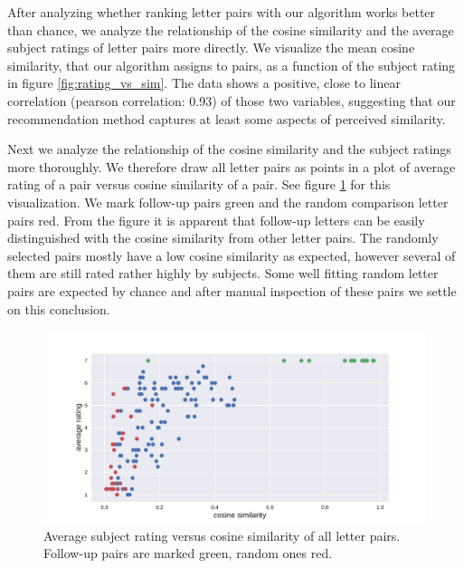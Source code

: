 After analyzing whether ranking letter pairs with our algorithm works better than chance, we analyze the relationship of the cosine similarity and the average subject ratings of letter pairs more directly. We visualize the mean cosine similarity, that our algorithm assigns to pairs, as a function of the subject rating in figure \ref{fig:rating_vs_sim}. The data shows a positive, close to linear correlation (pearson correlation: 0.93) of those two variables, suggesting that our recommendation method captures at least some aspects of perceived similarity.

Next we analyze the relationship of the cosine similarity and the subject ratings more thoroughly. We therefore draw all letter pairs as points in a plot of average rating of a pair versus cosine similarity of a pair. See figure \ref{fig:all_points} for this visualization. We mark follow-up pairs green and the random comparison letter pairs red. From the figure it is apparent that follow-up letters can be easily distinguished with the cosine similarity from other letter pairs. The randomly selected pairs mostly have a low cosine similarity as expected, however several of them are still rated rather highly by subjects. Some well fitting random letter pairs are expected by chance and after manual inspection of these pairs we settle on this conclusion.

\begin{figure}
	\includegraphics[width=\linewidth]{figures/rating_vs_similarity}
	\caption{Average subject rating versus cosine similarity of all letter pairs. Follow-up pairs are marked green, random ones red.}
	\label{fig:all_points}
\end{figure}



